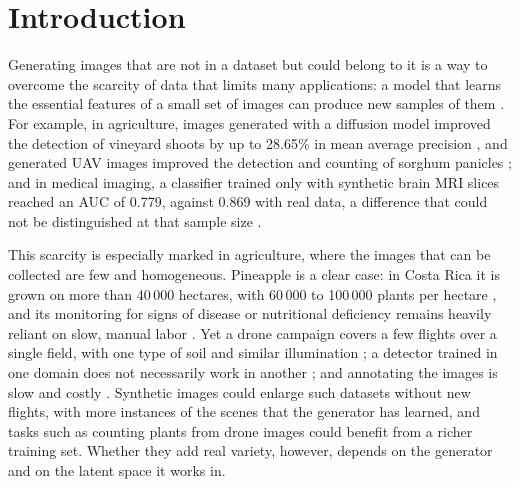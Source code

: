 \renewcommand{\baselinestretch}{1.5}
\onehalfspacing
{}

\chapter{Introduction}

Generating images that are not in a dataset but could belong to it is a way to overcome the scarcity of data that limits many applications: a model that learns the essential features of a small set of images can produce new samples of them \cite{Hu2025}. For example, in agriculture, images generated with a diffusion model improved the detection of vineyard shoots by up to 28.65\% in mean average precision \cite{Hirahara2025}, and generated UAV images improved the detection and counting of sorghum panicles \cite{Cai2022}; and in medical imaging, a classifier trained only with synthetic brain MRI slices reached an AUC of 0.779, against 0.869 with real data, a difference that could not be distinguished at that sample size \cite{Fallah2026}.

This scarcity is especially marked in agriculture, where the images that can be collected are few and homogeneous. Pineapple is a clear case: in Costa Rica it is grown on more than 40\,000 hectares, with 60\,000 to 100\,000 plants per hectare \cite{Castro2019}, and its monitoring for signs of disease or nutritional deficiency remains heavily reliant on slow, manual labor \cite{Gonzalez2026}. Yet a drone campaign covers a few flights over a single field, with one type of soil and similar illumination \cite{Gonzalez2026}; a detector trained in one domain does not necessarily work in another \cite{Bumbaca2025}; and annotating the images is slow and costly \cite{Bah2018,Cai2022}. Synthetic images could enlarge such datasets without new flights, with more instances of the scenes that the generator has learned, and tasks such as counting plants from drone images \cite{Kitano2019,Shiu2023} could benefit from a richer training set. Whether they add real variety, however, depends on the generator and on the latent space it works in.

